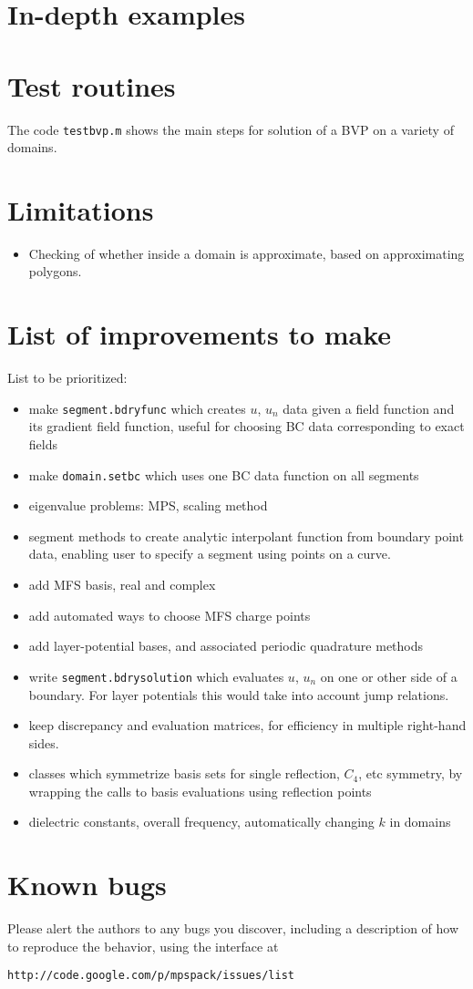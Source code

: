 \documentclass[12pt]{article}
\newcommand{\bi}{\begin{itemize}}
\newcommand{\ei}{\end{itemize}}
\begin{document}
\section{In-depth examples}

\section{Test routines}

The code {\tt testbvp.m} shows the main steps for solution of a BVP on
a variety of domains.

\section{Limitations}

\bi
\item Checking of whether inside a domain is approximate, based on approximating
polygons.
\ei

\section{List of improvements to make}

List to be prioritized:

\bi
\item make {\tt segment.bdryfunc} which creates $u$, $u_n$ data given a
field function and its gradient field function, useful for choosing BC
data corresponding to exact fields
\item make {\tt domain.setbc} which uses one BC data function on all segments
\item eigenvalue problems: MPS, scaling method
\item segment methods to create analytic interpolant function from boundary
point data, enabling user to specify a segment using points on a curve.
\item add MFS basis, real and complex
\item add automated ways to choose MFS charge points
\item add layer-potential bases, and associated periodic quadrature methods
\item write {\tt segment.bdrysolution} which evaluates $u$, $u_n$ on one
or other side of a boundary. For layer potentials this would take into account
jump relations.
\item keep discrepancy and evaluation matrices, for efficiency in multiple
right-hand sides.
\item classes which symmetrize basis sets for single reflection, $C_4$, etc
symmetry, by wrapping the calls to basis evaluations using reflection
points
\item dielectric constants, overall frequency,
automatically changing $k$ in domains
\ei

\section{Known bugs}

Please alert the authors to any bugs you discover, including a description
of how to reproduce the behavior, using the interface at

{\tt http://code.google.com/p/mpspack/issues/list}

 

\end{document}
